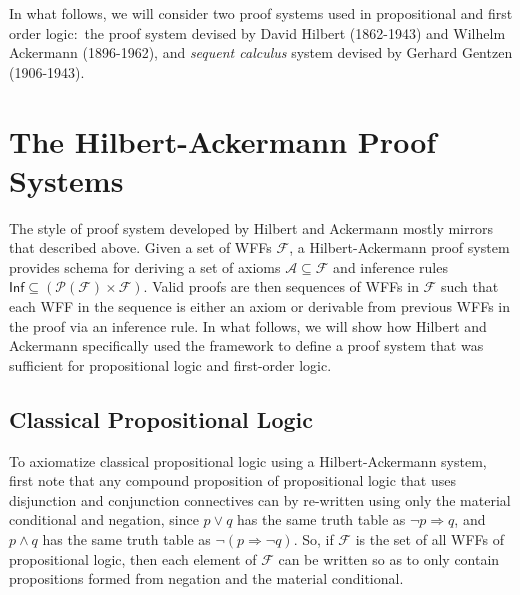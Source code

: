 \documentclass[11pt]{article}
\theoremstyle{definition}
\theoremstyle{remark}
\begin{document}
In what follows, we will consider two proof systems used in propositional and first order logic:\ the proof system devised by David Hilbert (1862-1943) and Wilhelm Ackermann (1896-1962), and \textit{sequent calculus} system devised by Gerhard Gentzen (1906-1943). 

\section{The Hilbert-Ackermann Proof Systems}
The style of proof system developed by Hilbert and Ackermann mostly mirrors that described above. Given a set of WFFs $\mathcal{F}$, a Hilbert-Ackermann proof system provides schema for deriving a set of axioms $\mathcal{A}\subseteq\mathcal{F}$ and inference rules $\textsf{Inf}\subseteq (\mathcal{P}(\mathcal{F})\times\mathcal{F})$. Valid proofs are then sequences of WFFs in $\mathcal{F}$ such that each WFF in the sequence is either an axiom or derivable from previous WFFs in the proof via an inference rule. In what follows, we will show how Hilbert and Ackermann specifically used the framework to define a proof system that was sufficient for propositional logic and first-order logic.\par 

\subsection{Classical Propositional Logic}
To axiomatize classical propositional logic using a Hilbert-Ackermann system, first note that any compound proposition of propositional logic that uses disjunction and conjunction connectives can by re-written using only the material conditional and negation, since $p\vee q$ has the same truth table as $\neg p \Rightarrow q$, and $p\wedge q$ has the same truth table as $\neg (p\Rightarrow \neg q)$. So, if $\mathcal{F}$ is the set of all WFFs of propositional logic, then each element of $\mathcal{F}$ can be written so as to only contain propositions formed from negation and the material conditional.\par
\end{document}
